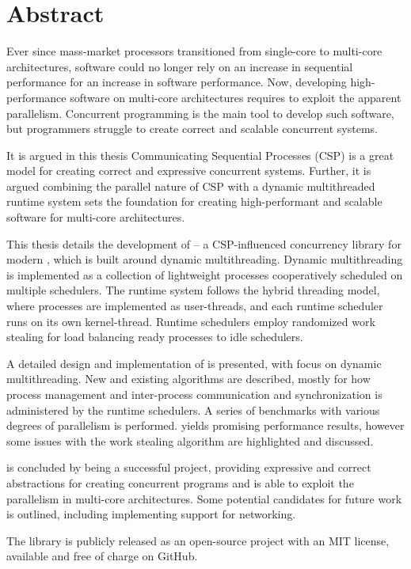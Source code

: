 
\newpage
{}
\section*{Abstract}


Ever since mass\hyp{}market processors transitioned from single\hyp{}core to multi\hyp{}core architectures, software could no longer rely on an increase in sequential performance for an increase in software performance. Now, developing high\hyp{}performance software on multi\hyp{}core architectures requires to exploit the apparent parallelism. Concurrent programming is the main tool to develop such software, but programmers struggle to create correct and scalable concurrent systems.

It is argued in this thesis Communicating Sequential Processes (CSP) is a great model for creating correct and expressive concurrent systems. Further, it is argued combining the parallel nature of CSP with a dynamic multithreaded runtime system sets the foundation for creating high\hyp{}performant and scalable software for multi\hyp{}core architectures.

This thesis details the development of \Proxc{} -- a CSP\hyp{}influenced concurrency library for modern \Cpp{}, which is built around dynamic multithreading. Dynamic multithreading is implemented as a collection of lightweight processes cooperatively scheduled on multiple schedulers. The runtime system follows the hybrid threading model, where processes are implemented as user\hyp{}threads, and each runtime scheduler runs on its own kernel\hyp{}thread. Runtime schedulers employ randomized work stealing for load balancing ready processes to idle schedulers.

A detailed design and implementation of \Proxc{} is presented, with focus on dynamic multithreading. New and existing algorithms are described, mostly for how process management and inter\hyp{}process communication and synchronization is administered by the runtime schedulers. A series of benchmarks with various degrees of parallelism is performed. \Proxc{} yields promising performance results, however some issues with the work stealing algorithm are highlighted and discussed.

\Proxc{} is concluded by being a successful project, providing expressive and correct abstractions for creating concurrent programs and is able to exploit the parallelism in multi\hyp{}core architectures. Some potential candidates for future work is outlined, including implementing support for networking.

The \Proxc{} library is publicly released as an open\hyp{}source project with an MIT license, available and free of charge on GitHub.

\vfill

\afterpage{\blankpage}
